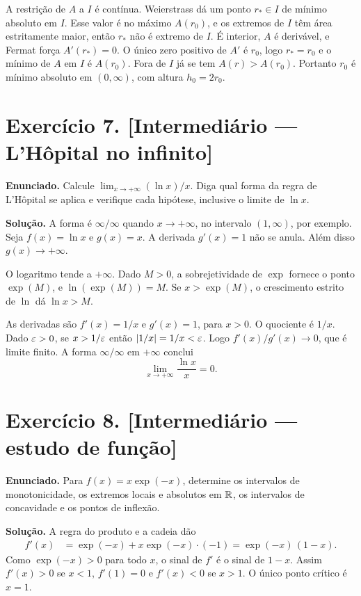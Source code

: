 \documentclass[11pt,a4paper]{article}
\begin{document}
A restrição de $A$ a $I$ é contínua. Weierstrass dá um ponto $r_*\in I$ de mínimo absoluto em $I$. Esse valor é no máximo $A(r_0)$, e os extremos de $I$ têm área estritamente maior, então $r_*$ não é extremo de $I$. É interior, $A$ é derivável, e Fermat força $A'(r_*)=0$. O único zero positivo de $A'$ é $r_0$, logo $r_*=r_0$ e o mínimo de $A$ em $I$ é $A(r_0)$. Fora de $I$ já se tem $A(r)>A(r_0)$. Portanto $r_0$ é mínimo absoluto em $(0,\infty)$, com altura $h_0=2r_0$.

\section*{Exercício 7. [Intermediário --- L'Hôpital no infinito]}

\textbf{Enunciado.} Calcule $\lim_{x\to+\infty}(\ln x)/x$. Diga qual forma da regra de L'Hôpital se aplica e verifique cada hipótese, inclusive o limite de $\ln x$.

\textbf{Solução.}
A forma é $\infty/\infty$ quando $x\to+\infty$, no intervalo $(1,\infty)$, por exemplo. Seja $f(x)=\ln x$ e $g(x)=x$. A derivada $g'(x)=1$ não se anula. Além disso $g(x)\to+\infty$.

O logaritmo tende a $+\infty$. Dado $M>0$, a sobrejetividade de $\exp$ fornece o ponto $\exp(M)$, e $\ln(\exp(M))=M$. Se $x>\exp(M)$, o crescimento estrito de $\ln$ dá $\ln x>M$.

As derivadas são $f'(x)=1/x$ e $g'(x)=1$, para $x>0$. O quociente é $1/x$. Dado $\varepsilon>0$, se $x>1/\varepsilon$ então $\left\lvert 1/x \right\rvert=1/x<\varepsilon$. Logo $f'(x)/g'(x)\to 0$, que é limite finito. A forma $\infty/\infty$ em $+\infty$ conclui
\[
\lim_{x\to+\infty}\frac{\ln x}{x}=0.
\]

\section*{Exercício 8. [Intermediário --- estudo de função]}

\textbf{Enunciado.} Para $f(x)=x\exp(-x)$, determine os intervalos de monotonicidade, os extremos locais e absolutos em $\mathbb{R}$, os intervalos de concavidade e os pontos de inflexão.

\textbf{Solução.}
A regra do produto e a cadeia dão
\begin{align*}
f'(x)
&=\exp(-x)+x\exp(-x)\cdot(-1)
=\exp(-x)\,(1-x).
\end{align*}
Como $\exp(-x)>0$ para todo $x$, o sinal de $f'$ é o sinal de $1-x$. Assim $f'(x)>0$ se $x<1$, $f'(1)=0$ e $f'(x)<0$ se $x>1$. O único ponto crítico é $x=1$.
\end{document}
